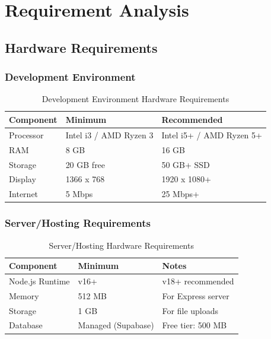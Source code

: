       \chapter{Requirement Analysis}

        \section{Hardware Requirements}

        \subsection{Development Environment}
        \begin{table}[H]
        \centering
        \begin{tabular}{|l|l|l|}
        \hline
        \textbf{Component} & \textbf{Minimum} & \textbf{Recommended} \\
        \hline
        Processor & Intel i3 / AMD Ryzen 3 & Intel i5+ / AMD Ryzen 5+ \\
        RAM & 8 GB & 16 GB \\
        Storage & 20 GB free & 50 GB+ SSD \\
        Display & 1366 x 768 & 1920 x 1080+ \\
        Internet & 5 Mbps & 25 Mbps+ \\
        \hline
        \end{tabular}
        \caption{Development Environment Hardware Requirements}
        \end{table}

        \subsection{Server/Hosting Requirements}
        \begin{table}[H]
        \centering
        \begin{tabular}{|l|l|l|}
        \hline
        \textbf{Component} & \textbf{Minimum} & \textbf{Notes} \\
        \hline
        Node.js Runtime & v16+ & v18+ recommended \\
        Memory & 512 MB & For Express server \\
        Storage & 1 GB & For file uploads \\
        Database & Managed (Supabase) & Free tier: 500 MB \\
        \hline
        \end{tabular}
        \caption{Server/Hosting Hardware Requirements}
        \end{table}


